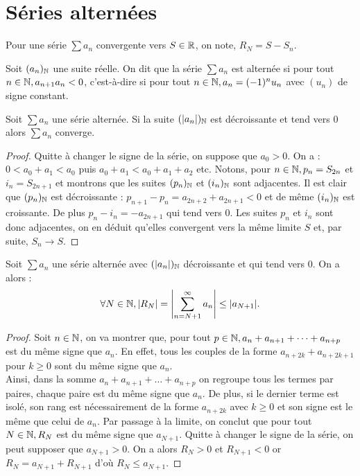 \documentclass[french]{article}
\begin{document}
\section{Séries alternées}

Pour une série $\sum a_n$ convergente vers $S \in \R$, on note, $R_N = S - S_n$.

\begin{defn}
Soit $(a_n)_\N$ une suite réelle. On dit que la série $\sum a_n$ est alternée si pour tout $n \in \N, a_{n+1}a_n < 0$,
c'est-à-dire si pour tout $n \in \N, a_n = (-1)^n u_n$ avec $(u_n)$ de signe constant. 
\end{defn}

\begin{thm}
Soit $\sum a_n$ une série alternée. Si la suite $(\abs{a_n})_\N$ est décroissante et tend vers 0 alors $\sum a_n$ converge.
\end{thm}

\begin{proof}
Quitte à changer le signe de la série, on suppose que $a_0 > 0$.
On a : $0 < a_0 + a_1 < a_0$ puis $a_0+a_1 < a_0 + a_1 + a_2$ etc.
Notons, pour $n \in \N, p_n = S_{2n}$ et $i_n = S_{2n+1}$ et montrons que les suites $(p_n)_\N$ et $(i_n)_\N$ sont adjacentes.
Il est clair que $(p_n)_\N$ est décroissante : $p_{n+1} - p_n = a_{2n+2} + a_{2n+1} < 0$
et de même $(i_n)_\N$ est croissante. De plus $p_n -  i_n = - a_{2n+1}$ qui tend vers 0.
Les suites $p_n$ et $i_n$ sont donc adjacentes, on en déduit qu'elles convergent vers la même limite $S$ et, par suite, $S_n \to S$.
\end{proof}

\begin{thm}
Soit $\sum a_n$ une série alternée avec $(\abs{a_n})_\N$ décroissante et qui tend vers 0.
On a alors :
\[ \forall N \in \N, \abs*{R_N} = \abs*{\sum_{n=N+1}^\infty a_n} \leq \abs{a_{N+1}} . \]
\end{thm}

\begin{proof}
Soit $n \in \N$, on va montrer que, pour tout $p \in \N, a_n + a_{n+1} + \dots + a_{n+p}$ est du même signe que $a_n$.
En effet, tous les couples de la forme $a_{n+2k} + a_{n+2k+1}$ pour $k \geq 0$ sont du même signe que $a_n$. \\
Ainsi, dans la somme $a_n + a_{n+1} + \dots + a_{n+p}$ on regroupe tous les termes par paires, chaque paire est du même signe que 
$a_n$. De plus, si le dernier terme est isolé, son rang est nécessairement de la forme $a_{n+2k}$ avec $k \geq 0$ 
et son signe est le même que celui de $a_n$. 
Par passage à la limite, on conclut que pour tout $N \in \N, R_N$ est du même signe que $a_{N+1}$.
Quitte à changer le signe de la série, on peut supposer que $a_{N+1} > 0$. On a alors $R_N > 0$ et $R_{N+1} < 0$
or $R_N = a_{N+1} + R_{N+1}$ d'où $R_N \leq a_{N+1}$.
\end{proof}
\end{document}
